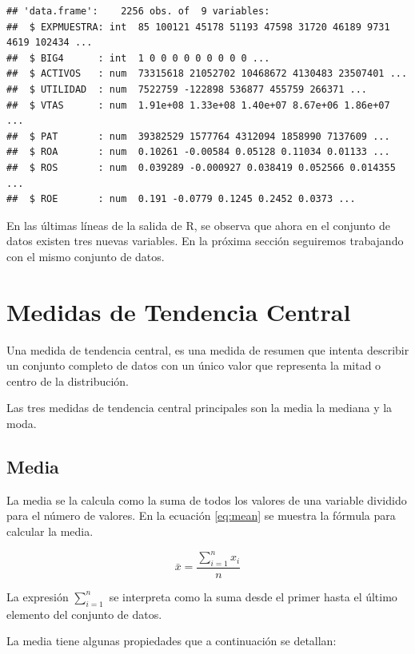 \documentclass[]{book}
\begin{document}
\begin{verbatim}
## 'data.frame':    2256 obs. of  9 variables:
##  $ EXPMUESTRA: int  85 100121 45178 51193 47598 31720 46189 9731 4619 102434 ...
##  $ BIG4      : int  1 0 0 0 0 0 0 0 0 0 ...
##  $ ACTIVOS   : num  73315618 21052702 10468672 4130483 23507401 ...
##  $ UTILIDAD  : num  7522759 -122898 536877 455759 266371 ...
##  $ VTAS      : num  1.91e+08 1.33e+08 1.40e+07 8.67e+06 1.86e+07 ...
##  $ PAT       : num  39382529 1577764 4312094 1858990 7137609 ...
##  $ ROA       : num  0.10261 -0.00584 0.05128 0.11034 0.01133 ...
##  $ ROS       : num  0.039289 -0.000927 0.038419 0.052566 0.014355 ...
##  $ ROE       : num  0.191 -0.0779 0.1245 0.2452 0.0373 ...
\end{verbatim}

En las últimas líneas de la salida de R, se observa que ahora en el conjunto de datos existen tres nuevas variables. En la próxima sección seguiremos trabajando con el mismo conjunto de datos.

\hypertarget{medidas-de-tendencia-central}{%
\section{Medidas de Tendencia Central}\label{medidas-de-tendencia-central}}

Una medida de tendencia central, es una medida de resumen que intenta describir un conjunto completo de datos con un único valor que representa la mitad o centro de la distribución.

Las tres medidas de tendencia central principales son la media la mediana y la moda.

\hypertarget{media}{%
\subsection{Media}\label{media}}

La media se la calcula como la suma de todos los valores de una variable dividido para el número de valores. En la ecuación \eqref{eq:mean} se muestra la fórmula para calcular la media.

\begin{equation} 
  \bar{x} = \dfrac{\sum_{i=1}^{n}x_i}{n}
  \label{eq:mean}
\end{equation}

La expresión \(\sum_{i=1}^{n}\) se interpreta como la suma desde el primer hasta el último elemento del conjunto de datos.

La media tiene algunas propiedades que a continuación se detallan:
\end{document}
